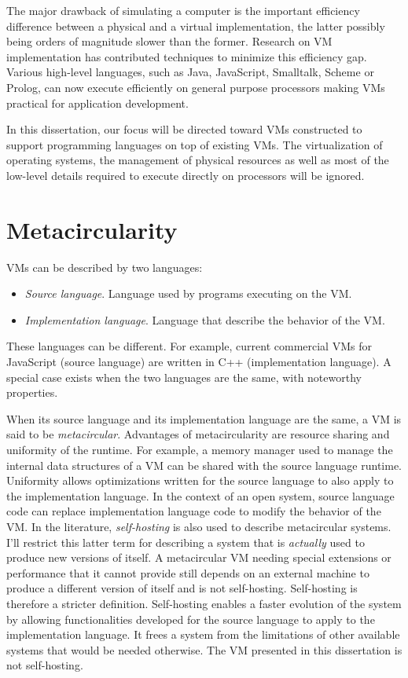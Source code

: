 The major drawback of simulating a computer is the important efficiency
difference between a physical and a virtual implementation, the latter possibly
being orders of magnitude slower than the former. Research on VM
implementation has contributed techniques to minimize this efficiency gap.
Various high-level languages, such as Java, JavaScript, Smalltalk, Scheme or
Prolog, can now execute efficiently on general purpose processors making VMs
practical for application development.

In this dissertation, our focus will be directed toward VMs constructed to
support programming languages on top of existing VMs. The virtualization of
operating systems, the management of physical resources as well as most of the
low-level details required to execute directly on processors will be ignored.

\section{Metacircularity}

VMs can be described by two languages:
\begin{itemize}
    \item \textit{Source language}. Language used by programs executing on the
        VM.
    \item \textit{Implementation language}. Language that describe the behavior
        of the VM.
\end{itemize}
These languages can be different. For example, current commercial VMs for
JavaScript (source language) are written in C++ (implementation language).  A
special case exists when the two languages are the same, with noteworthy
properties.

When its source language and its implementation language are the same, a VM is
said to be \textit{metacircular}. Advantages of metacircularity are resource
sharing and uniformity of the runtime. For example, a memory manager used to
manage the internal data structures of a VM can be shared with the source
language runtime. Uniformity allows optimizations written for the source
language to also apply to the implementation language. In the context of an
open system, source language code can replace implementation language code to
modify the behavior of the VM. In the literature, \textit{self-hosting} is
also used to describe metacircular systems. I'll restrict this latter term for
describing a system that is \textit{actually} used to produce new versions of
itself.  A metacircular VM needing special extensions or performance that it
cannot provide still depends on an external machine to produce a different
version of itself and is not self-hosting.  Self-hosting is therefore a
stricter definition.  Self-hosting enables a faster evolution of the system by
allowing functionalities developed for the source language to apply to the
implementation language. It frees a system from the limitations of other
available systems that would be needed otherwise. The VM presented in this
dissertation is not self-hosting.


